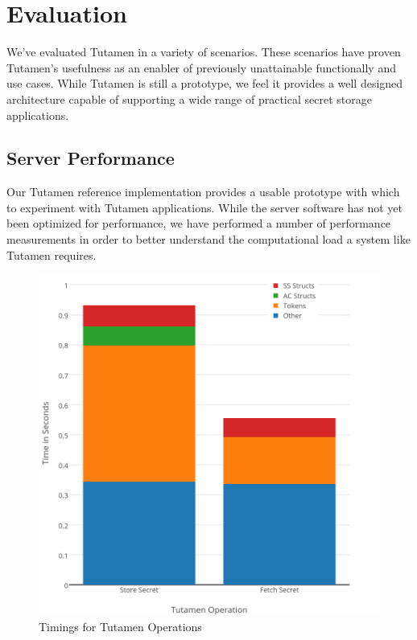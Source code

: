 \section{Evaluation}
\label{sec:eval}

We've evaluated Tutamen in a variety of scenarios. These scenarios
have proven Tutamen's usefulness as an enabler of previously
unattainable functionally and use cases. While Tutamen is still a
prototype, we feel it provides a well designed architecture capable of
supporting a wide range of practical secret storage applications.

\subsection{Server Performance}

Our Tutamen reference implementation provides a usable prototype with
which to experiment with Tutamen applications. While the server
software has not yet been optimized for performance, we have performed
a number of performance measurements in order to better understand the
computational load a system like Tutamen requires.

\begin{figure}[th]
  \centering
  \includegraphics[width=\columnwidth]{./figs/png/chart-combined-timings.png}
  \caption{Timings for Tutamen Operations}
  \label{fig:eval:timings}
\end{figure}

